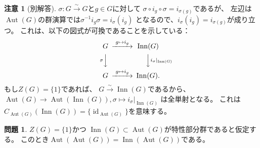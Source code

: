 \documentclass[uplatex]{jsreport}
\theoremstyle{definition}
\newtheorem{prob}[prob]{問題}
\newtheorem*{rem*}{注意}
\DeclareMathOperator{\id}{\mathrm{id}}
\DeclareMathOperator{\INN}{\mathrm{Inn}}
\DeclareMathOperator{\Aut}{\mathrm{Aut}}
\begin{document}
\begin{rem*}[別解答]
  \(\sigma:G\xrightarrow{\sim} G\)と\(g\in G\)に対して
  \(\sigma \circ i_g \circ \sigma = i_{\sigma(g)}\)であるが、
  左辺は\(\Aut(G)\)の群演算では\(\sigma^{-1}i_g\sigma = i_{\sigma}(i_g)\)
  となるので、\(i_{\sigma}(i_g) = i_{\sigma(g)}\)が成り立つ。
  これは、以下の図式が可換であることを示している：
  \[
  \begin{CD}
    G @>{g\mapsto i_g}>> \INN(G) \\
    @V{\sigma}VV @VV{i_{\sigma}|_{\INN(G)}}V \\
    G @>{g\mapsto i_g}>> \INN(G).
  \end{CD}
  \]
  もし\(Z(G) = \{1\}\)であれば、
  \(G\xrightarrow{\sim} \INN(G)\)であるから、
  \(\Aut(G) \to \Aut(\INN(G)), \sigma \mapsto i_{\sigma}|_{\INN(G)}\)
  は全単射となる。
  これは\(C_{\Aut(G)}(\INN(G)) = \{\id_{\Aut(G)}\}\)を意味する。
\end{rem*}




\begin{prob}
  \(Z(G) = \{1\}\)かつ
  \(\INN(G)\subset \Aut(G)\)が特性部分群であると仮定する。
  このとき\(\Aut(\Aut(G)) = \INN(\Aut(G))\)である。
\end{prob}
\end{document}
